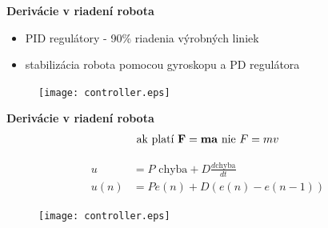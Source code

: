 \documentclass[xcolor=dvipsnames]{beamer}
\begin{document}
\begin{frame}{\bf Derivácie v riadení robota}

\begin {itemize}
\item PID regulátory - 90\% riadenia výrobných liniek
\item stabilizácia robota pomocou gyroskopu a PD regulátora
\end {itemize}

\begin{figure}[htbp]
  \centering
    \texttt{[image: controller.eps]}
\end{figure}

\end{frame}


\begin{frame}{\bf Derivácie v riadení robota}
\begin{align*}
\text{ak platí } {\bf F = ma} \text{ nie } F = mv
\end{align*}

\begin{align*}
u &= P\text{ chyba} + D \frac{d \text{chyba}}{dt} \\
u(n) &= Pe(n) + D(e(n) - e(n-1))
\end{align*}

\begin{figure}[htbp]
  \centering
    \texttt{[image: controller.eps]}
\end{figure}

\end{frame}
\end{document}
